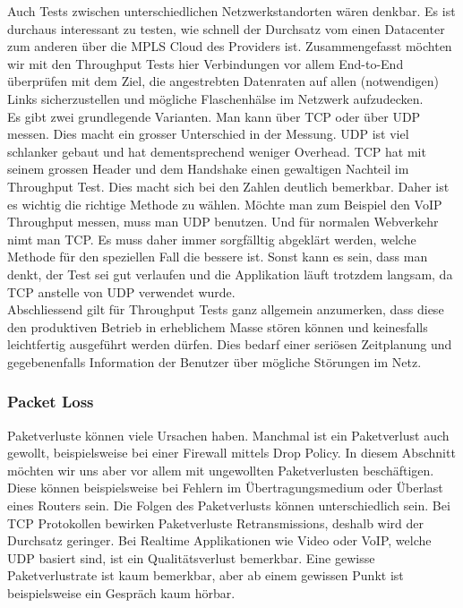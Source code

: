 \documentclass[a4,12pt]{scrartcl}
\begin{document}
\noindent
Auch Tests zwischen unterschiedlichen Netzwerkstandorten wären denkbar. Es ist durchaus interessant zu testen, wie schnell der Durchsatz vom einen Datacenter zum anderen über die MPLS Cloud des Providers ist. Zusammengefasst möchten wir mit den Throughput Tests hier Verbindungen vor allem End-to-End überprüfen mit dem Ziel, die angestrebten Datenraten auf allen (notwendigen) Links sicherzustellen und mögliche Flaschenhälse im Netzwerk aufzudecken.\\

\noindent Es gibt zwei grundlegende Varianten. Man kann über TCP oder über UDP messen. Dies macht ein grosser Unterschied in der Messung. 
UDP ist viel schlanker gebaut und hat dementsprechend weniger Overhead. TCP hat mit seinem grossen Header und dem Handshake einen gewaltigen Nachteil im Throughput Test. Dies macht sich bei den Zahlen deutlich bemerkbar.\newline\newline
Daher ist es wichtig die richtige Methode zu wählen.
Möchte man zum Beispiel den VoIP Throughput messen, muss man UDP benutzen. Und für normalen Webverkehr nimt man TCP. Es muss daher immer sorgfälltig abgeklärt werden, welche Methode für den speziellen Fall die bessere ist. Sonst kann es sein, dass man denkt, der Test sei gut verlaufen und die Applikation läuft trotzdem langsam, da TCP anstelle von UDP verwendet wurde.\\

\noindent Abschliessend gilt für Throughput Tests ganz allgemein anzumerken, dass diese den produktiven Betrieb in erheblichem Masse stören können und keinesfalls leichtfertig ausgeführt werden dürfen. Dies bedarf einer seriösen Zeitplanung und gegebenenfalls Information der Benutzer über mögliche Störungen im Netz.\\

\noindent \subsubsection{Packet Loss} 
Paketverluste können viele Ursachen haben. Manchmal ist ein Paketverlust auch gewollt, beispielsweise bei einer Firewall mittels Drop Policy. In diesem Abschnitt möchten wir uns aber vor allem mit ungewollten Paketverlusten beschäftigen. Diese können beispielsweise bei Fehlern im Übertragungsmedium oder Überlast eines Routers sein. Die Folgen des Paketverlusts können unterschiedlich sein. Bei TCP Protokollen bewirken Paketverluste Retransmissions, deshalb wird der Durchsatz geringer. Bei Realtime Applikationen wie Video oder VoIP, welche UDP basiert sind, ist ein Qualitätsverlust bemerkbar. Eine gewisse Paketverlustrate ist kaum bemerkbar, aber ab einem gewissen Punkt ist beispielsweise ein Gespräch kaum hörbar.\\
\end{document}
